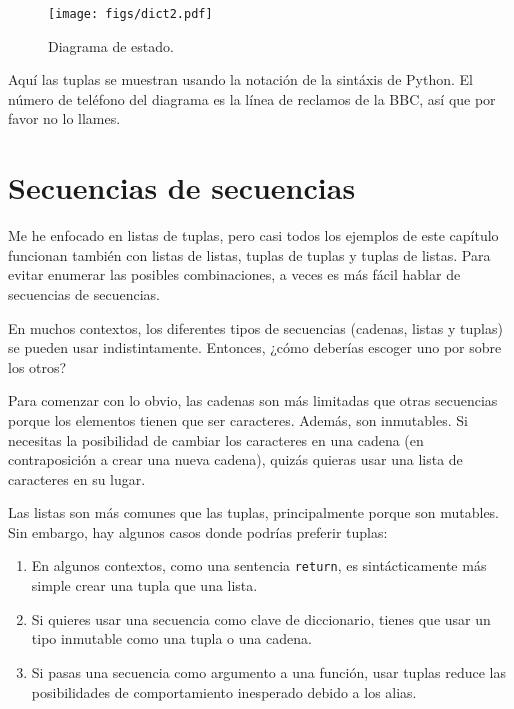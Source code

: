 \documentclass[10pt]{book}
\begin{document}
\begin{figure}
\centerline
{\texttt{[image: figs/dict2.pdf]}}
\caption{Diagrama de estado.}
\label{fig.dict2}
\end{figure}

Aquí las tuplas se muestran usando la notación de la sintáxis de Python.
El número de teléfono del diagrama es la línea de reclamos
de la BBC, así que por favor no lo llames.


\section{Secuencias de secuencias}

Me he enfocado en listas de tuplas, pero casi todos los ejemplos de
este capítulo funcionan también con listas de listas, tuplas de tuplas y
tuplas de listas.  Para evitar enumerar las posibles combinaciones, a veces
es más fácil hablar de secuencias de secuencias.

En muchos contextos, los diferentes tipos de secuencias (cadenas, listas y
tuplas) se pueden usar indistintamente.  Entonces, ¿cómo deberías escoger uno
por sobre los otros?

Para comenzar con lo obvio, las cadenas son más limitadas que otras
secuencias porque los elementos tienen que ser caracteres.  Además,
son inmutables.  Si necesitas la posibilidad de cambiar los caracteres
en una cadena (en contraposición a crear una nueva cadena), quizás quieras
usar una lista de caracteres en su lugar.

Las listas son más comunes que las tuplas, principalmente porque son mutables.
Sin embargo, hay algunos casos donde podrías preferir tuplas:

\begin{enumerate}

\item En algunos contextos, como una sentencia {\tt return}, es
sintácticamente más simple crear una tupla que una lista.

\item Si quieres usar una secuencia como clave de diccionario,
tienes que usar un tipo inmutable como una tupla o una cadena.

\item Si pasas una secuencia como argumento a una función,
usar tuplas reduce las posibilidades de comportamiento inesperado
debido a los alias.

\end{enumerate}
\end{document}
